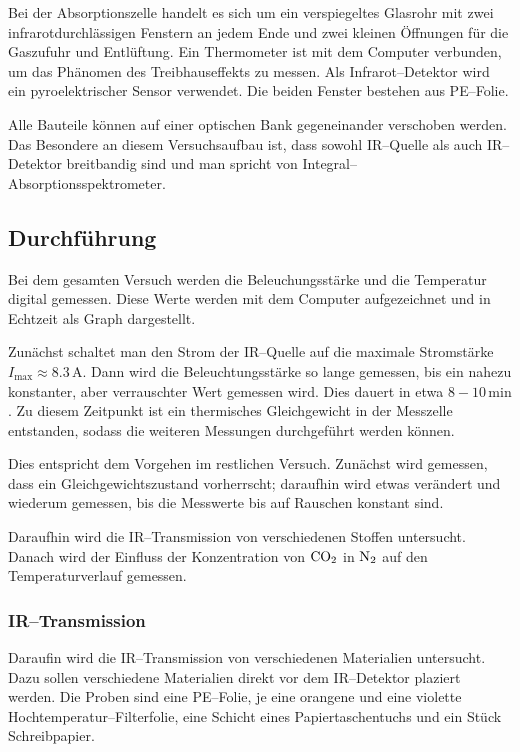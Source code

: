 \documentclass[12pt,a4paper]{scrartcl}
\numberwithin{equation}{section} %
\begin{document}
Bei der Absorptionszelle handelt es sich um ein verspiegeltes Glasrohr mit zwei infrarotdurchlässigen Fenstern an jedem Ende und zwei kleinen Öffnungen für die Gaszufuhr und Entlüftung. Ein Thermometer ist mit dem Computer verbunden, um das Phänomen des Treibhauseffekts zu messen. Als Infrarot--Detektor wird ein pyroelektrischer Sensor verwendet. Die beiden Fenster bestehen aus PE--Folie.

Alle Bauteile können auf einer optischen Bank gegeneinander verschoben werden. Das Besondere an diesem Versuchsaufbau ist, dass sowohl IR--Quelle als auch IR--Detektor breitbandig sind und man spricht von Integral--Absorptionsspektrometer.

\subsection{Durchführung}
\label{durchfuehrung}
Bei dem gesamten Versuch werden die Beleuchungsstärke und die Temperatur digital gemessen. Diese Werte werden mit dem Computer aufgezeichnet und in Echtzeit als Graph dargestellt.

Zunächst schaltet man den Strom der IR--Quelle auf die maximale Stromstärke $I_\mathrm{max}\approx 8.3\mathrm{\,A}$. Dann wird die Beleuchtungsstärke so lange gemessen, bis ein nahezu konstanter, aber verrauschter Wert gemessen wird. Dies dauert in etwa $8-10\mathrm{\,min}$. Zu diesem Zeitpunkt ist ein thermisches Gleichgewicht in der Messzelle entstanden, sodass die weiteren Messungen durchgeführt werden können.

Dies entspricht dem Vorgehen im restlichen Versuch. Zunächst wird gemessen, dass ein Gleichgewichtszustand vorherrscht; daraufhin wird etwas verändert und wiederum gemessen, bis die Messwerte bis auf Rauschen konstant sind.

Daraufhin wird die IR--Transmission von verschiedenen Stoffen untersucht. Danach wird der Einfluss der Konzentration von $\ce{CO_2}$ in $\ce{N_2}$ auf den Temperaturverlauf gemessen.

\subsubsection{IR--Transmission}
\label{IR--Transmission}

Daraufin wird die IR--Transmission von verschiedenen Materialien untersucht. Dazu sollen verschiedene Materialien direkt vor dem IR--Detektor plaziert werden. Die Proben sind eine PE--Folie, je eine orangene und eine violette Hochtemperatur--Filterfolie, eine Schicht eines Papiertaschentuchs und ein Stück Schreibpapier.
\end{document}

